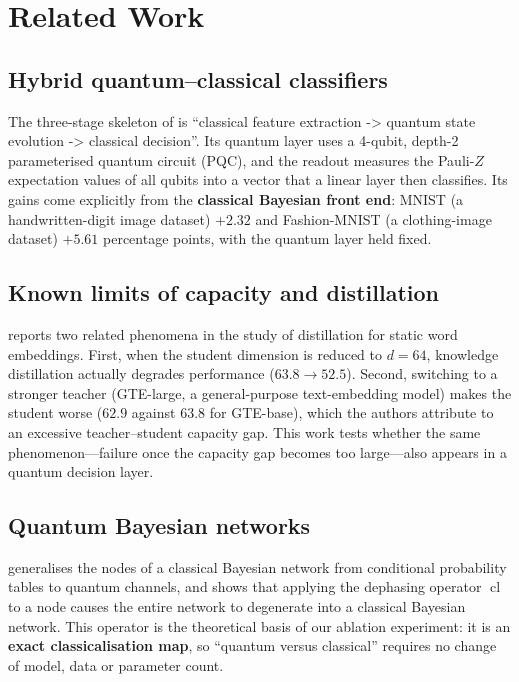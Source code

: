 \documentclass{article}
\begin{document}
\section{Related Work}

\subsection{Hybrid quantum--classical classifiers}

The three-stage skeleton of \cite{wang2026} is ``classical feature
extraction -\textgreater{} quantum state evolution -\textgreater{}
classical decision''. Its quantum layer uses a 4-qubit, depth-2
parameterised quantum circuit (PQC), and the readout measures the
Pauli-\(Z\) expectation values of all qubits into a vector that a linear
layer then classifies. Its gains come explicitly from the
\textbf{classical Bayesian front end}: MNIST (a handwritten-digit image
dataset) \(+ 2.32\) and Fashion-MNIST (a clothing-image dataset)
\(+ 5.61\) percentage points, with the quantum layer held fixed.

\subsection{Known limits of capacity and distillation}

\cite{wada2025} reports two related phenomena in the study of
distillation for static word embeddings. First, when the student
dimension is reduced to \(d = 64\), knowledge distillation actually
degrades performance (\(63.8 \rightarrow 52.5\)). Second, switching to a
stronger teacher (GTE-large, a general-purpose text-embedding model)
makes the student worse (\(62.9\) against \(63.8\) for GTE-base), which
the authors attribute to an excessive teacher--student capacity gap.
This work tests whether the same phenomenon---failure once the capacity
gap becomes too large---also appears in a quantum decision layer.

\subsection{Quantum Bayesian networks}

\cite{tucci2012} generalises the nodes of a classical Bayesian network
from conditional probability tables to quantum channels, and shows that
applying the dephasing operator \(\operatorname{cl}\) to a node causes
the entire network to degenerate into a classical Bayesian network. This
operator is the theoretical basis of our ablation experiment: it is an
\textbf{exact classicalisation map}, so ``quantum versus classical''
requires no change of model, data or parameter count.
\end{document}
